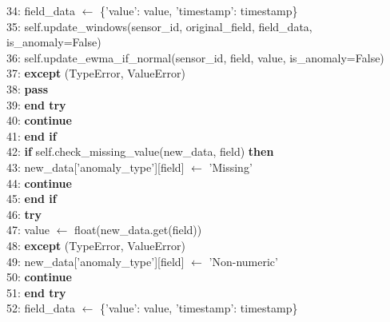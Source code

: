 \begin{breakablealgorithm}[H]
\begin{flushleft}
34: \hspace{2em} field\_data $\gets$ \{'value': value, 'timestamp': timestamp\} \\
35: \hspace{2em} self.update\_windows(sensor\_id, original\_field, field\_data, is\_anomaly=False) \\
36: \hspace{2em} self.update\_ewma\_if\_normal(sensor\_id, field, value, is\_anomaly=False) \\
37: \hspace{1.5em} \textbf{except} (TypeError, ValueError) \\
38: \hspace{2em} \textbf{pass} \\
39: \hspace{1.5em} \textbf{end try} \\
40: \hspace{1.5em} \textbf{continue} \\
41: \hspace{1em} \textbf{end if} \\
42: \hspace{1em} \textbf{if} self.check\_missing\_value(new\_data, field) \textbf{then} \\
43: \hspace{1.5em} new\_data['anomaly\_type'][field] $\gets$ 'Missing' \\
44: \hspace{1.5em} \textbf{continue} \\
45: \hspace{1em} \textbf{end if} \\
46: \hspace{1em} \textbf{try} \\
47: \hspace{1.5em} value $\gets$ float(new\_data.get(field)) \\
48: \hspace{1em} \textbf{except} (TypeError, ValueError) \\
49: \hspace{1.5em} new\_data['anomaly\_type'][field] $\gets$ 'Non-numeric' \\
50: \hspace{1.5em} \textbf{continue} \\
51: \hspace{1em} \textbf{end try} \\
52: \hspace{1em} field\_data $\gets$ \{'value': value, 'timestamp': timestamp\} \\

\end{flushleft}
\end{breakablealgorithm}
